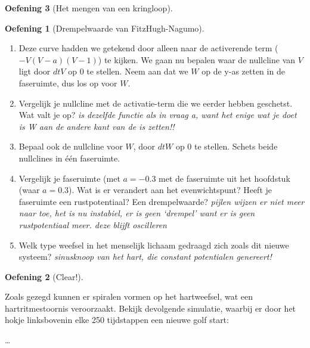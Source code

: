 \documentclass[
  a4paper,
]{scrbook}
\providecommand{\tightlist}{%
  \setlength{\itemsep}{0pt}\setlength{\parskip}{0pt}}\usepackage{longtable,booktabs,array}
\theoremstyle{definition}
\newtheorem{exercise}{Oefening}[chapter]
\theoremstyle{remark}
\begin{document}
\begin{exercise}[Het mengen van een
kringloop]
\begin{exercise}[Drempelwaarde van
FitzHugh-Nagumo]
\begin{enumerate}
\def\labelenumi{\alph{enumi}.}
\setcounter{enumi}{2}
\tightlist
\item
  Deze curve hadden we getekend door alleen naar de activerende term
  (\(-V(V-a)(V-1)\)) te kijken. We gaan nu bepalen waar de nullcline van
  \(V\) ligt door \(dt{V}\) op 0 te stellen. Neem aan dat we \(W\) op de
  y-as zetten in de faseruimte, dus los op voor \(W\).
\item
  Vergelijk je nullcline met de activatie-term die we eerder hebben
  geschetst. Wat valt je op? \emph{is dezelfde functie als in vraag a,
  want het enige wat je doet is W aan de andere kant van de is zetten!!}
\item
  Bepaal ook de nullcline voor \(W\), door \(dt{W}\) op 0 te stellen.
  Schets beide nullclines in één faseruimte.
\item
  Vergelijk je faseruimte (met \(a=-0.3\) met de faseruimte uit het
  hoofdstuk (waar \(a=0.3\)). Wat is er verandert aan het
  evenwichtspunt? Heeft je faseruimte een rustpotentiaal? Een
  drempelwaarde? \emph{pijlen wijzen er niet meer naar toe, het is nu
  instabiel, er is geen `drempel' want er is geen rustpotentiaal meer.
  deze blijft oscilleren}
\item
  Welk type weefsel in het menselijk lichaam gedraagd zich zoals dit
  nieuwe systeem? \emph{sinusknoop van het hart, die constant
  potentialen genereert!}
\end{enumerate}

\end{exercise}

\begin{exercise}[Clear!]\protect\hypertarget{exr-clear}{}\label{exr-clear}

Zoals gezegd kunnen er spiralen vormen op het hartweefsel, wat een
hartritmestoornis veroorzaakt. Bekijk devolgende simulatie, waarbij er
door het hokje linksbovenin elke 250 tijdstappen een nieuwe golf start:

\ldots{}


\end{exercise}
\end{exercise}
\end{document}
